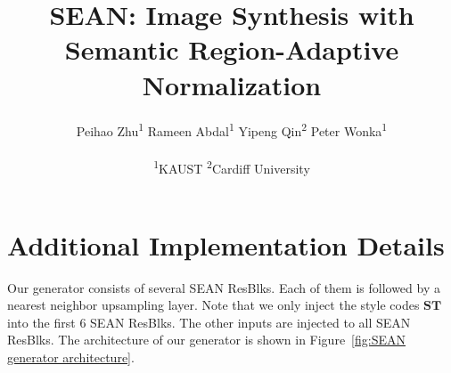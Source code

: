 \documentclass[10pt,twocolumn,letterpaper]{article}
\begin{document}
\title{SEAN: Image Synthesis with Semantic Region-Adaptive Normalization}

\author{Peihao Zhu\textsuperscript{1} \quad Rameen Abdal\textsuperscript{1} \quad Yipeng Qin\textsuperscript{2} \quad Peter Wonka\textsuperscript{1} \\
\\
\textsuperscript{1}KAUST \quad \textsuperscript{2}Cardiff University
}




\maketitle
\thispagestyle{empty}
\appendix

\section{Additional Implementation Details}

 Our generator consists of several SEAN ResBlks. Each of them is followed by a nearest neighbor upsampling layer. Note that we only inject the style codes $\mathbf{ST}$ into the first 6 SEAN ResBlks. The other inputs are injected to all SEAN ResBlks. The architecture of our generator is shown in Figure~\ref{fig:SEAN generator architecture}.
\end{document}
